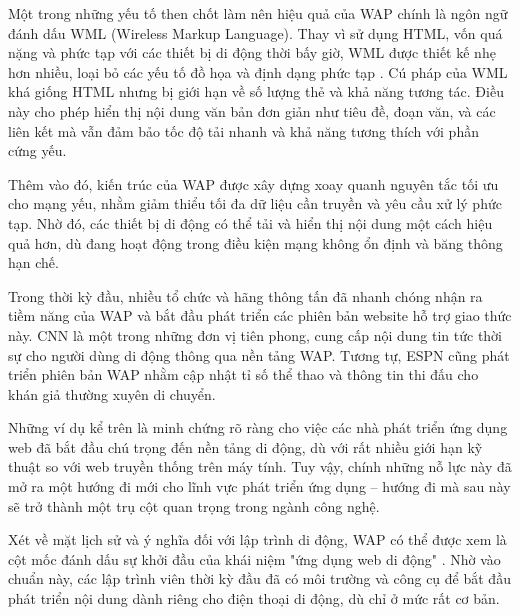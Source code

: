   \begin{flushleft}
  \hspace*{0.8cm}Một trong những yếu tố then chốt làm nên hiệu quả của WAP chính là ngôn ngữ đánh dấu WML (Wireless Markup Language). Thay vì sử dụng HTML, vốn quá nặng và phức tạp với các thiết bị di động thời bấy giờ, WML được thiết kế nhẹ hơn nhiều, loại bỏ các yếu tố đồ họa và định dạng phức tạp \cite{wml-design}. Cú pháp của WML khá giống HTML nhưng bị giới hạn về số lượng thẻ và khả năng tương tác. Điều này cho phép hiển thị nội dung văn bản đơn giản như tiêu đề, đoạn văn, và các liên kết mà vẫn đảm bảo tốc độ tải nhanh và khả năng tương thích với phần cứng yếu.
  \end{flushleft}
  
  \begin{flushleft}
  \hspace*{0.8cm}Thêm vào đó, kiến trúc của WAP được xây dựng xoay quanh nguyên tắc tối ưu cho mạng yếu, nhằm giảm thiểu tối đa dữ liệu cần truyền và yêu cầu xử lý phức tạp. Nhờ đó, các thiết bị di động có thể tải và hiển thị nội dung một cách hiệu quả hơn, dù đang hoạt động trong điều kiện mạng không ổn định và băng thông hạn chế.
  \end{flushleft}
  
  \begin{flushleft}
  \hspace*{0.8cm}Trong thời kỳ đầu, nhiều tổ chức và hãng thông tấn đã nhanh chóng nhận ra tiềm năng của WAP và bắt đầu phát triển các phiên bản website hỗ trợ giao thức này. CNN là một trong những đơn vị tiên phong, cung cấp nội dung tin tức thời sự cho người dùng di động thông qua nền tảng WAP. Tương tự, ESPN cũng phát triển phiên bản WAP nhằm cập nhật tỉ số thể thao và thông tin thi đấu cho khán giả thường xuyên di chuyển\cite{cnn-espn-wap}.
  \end{flushleft}
  
  \begin{flushleft}
  \hspace*{0.8cm}Những ví dụ kể trên là minh chứng rõ ràng cho việc các nhà phát triển ứng dụng web đã bắt đầu chú trọng đến nền tảng di động, dù với rất nhiều giới hạn kỹ thuật so với web truyền thống trên máy tính. Tuy vậy, chính những nỗ lực này đã mở ra một hướng đi mới cho lĩnh vực phát triển ứng dụng – hướng đi mà sau này sẽ trở thành một trụ cột quan trọng trong ngành công nghệ.
  \end{flushleft}
  
  \begin{flushleft}
  \hspace*{0.8cm}Xét về mặt lịch sử và ý nghĩa đối với lập trình di động, WAP có thể được xem là cột mốc đánh dấu sự khởi đầu của khái niệm "ứng dụng web di động" \cite{wap-history}. Nhờ vào chuẩn này, các lập trình viên thời kỳ đầu đã có môi trường và công cụ để bắt đầu phát triển nội dung dành riêng cho điện thoại di động, dù chỉ ở mức rất cơ bản.
  \end{flushleft}
  
